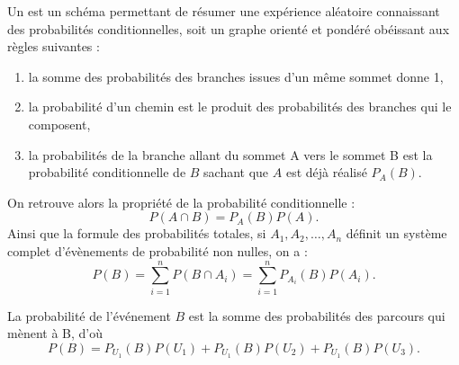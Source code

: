 \documentclass{book}
\begin{document}
\begin{Definition}
Un  est un schéma permettant de résumer une expérience aléatoire connaissant des probabilités conditionnelles, soit un graphe orienté et pondéré obéissant aux règles suivantes :
\begin{enumerate}
\item la somme des probabilités des branches issues d'un même sommet donne 1,
\item la probabilité d'un chemin est le produit des probabilités des branches qui le composent,
\item la probabilités de la branche allant du sommet A vers le sommet B est la probabilité conditionnelle de $B$ sachant que $A$ est déjà réalisé $P_A(B)$.
\end{enumerate}
On retrouve alors la propriété de la probabilité conditionnelle :
$$ P(A\cap B)= P_{A}(B)P(A).$$
Ainsi que la formule des probabilités totales, si $A_1, A_2, \dots , A_n$ définit un système complet d'évènements de probabilité non nulles, on a :
$$ P(B)=\sum _{i=1}^{n}P(B\cap A_{i})=\sum _{i=1}^{n} P_{A_{i}}(B)P(A_{i}).$$
\end{Definition}
%
\begin{Exemple}[3 urnes]
\begin{center}
\end{center}
La probabilité de  l'événement $B$ est la somme des probabilités des parcours
qui mènent à B, d'où 
$$P(B)= P_{U_1}(B)P(U_1)+P_{U_1}(B)P(U_2)+P_{U_1}(B)P(U_3).$$
\end{Exemple}
\end{document}
